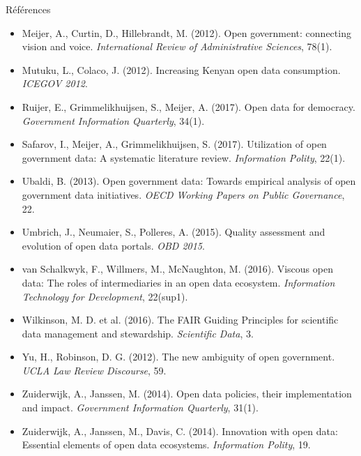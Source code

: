 \documentclass[11pt,aspectratio=169]{beamer}
\begin{document}
\begin{frame}[allowframebreaks]{Références}
\begin{itemize}
    \item Meijer, A., Curtin, D., Hillebrandt, M. (2012). Open government: connecting vision and voice. \emph{International Review of Administrative Sciences}, 78(1).
    \item Mutuku, L., Colaco, J. (2012). Increasing Kenyan open data consumption. \emph{ICEGOV 2012}.
    \item Ruijer, E., Grimmelikhuijsen, S., Meijer, A. (2017). Open data for democracy. \emph{Government Information Quarterly}, 34(1).
    \item Safarov, I., Meijer, A., Grimmelikhuijsen, S. (2017). Utilization of open government data: A systematic literature review. \emph{Information Polity}, 22(1).
    \item Ubaldi, B. (2013). Open government data: Towards empirical analysis of open government data initiatives. \emph{OECD Working Papers on Public Governance}, 22.
    \item Umbrich, J., Neumaier, S., Polleres, A. (2015). Quality assessment and evolution of open data portals. \emph{OBD 2015}.
    \item van Schalkwyk, F., Willmers, M., McNaughton, M. (2016). Viscous open data: The roles of intermediaries in an open data ecosystem. \emph{Information Technology for Development}, 22(sup1).
    \item Wilkinson, M. D. et al. (2016). The FAIR Guiding Principles for scientific data management and stewardship. \emph{Scientific Data}, 3.
    \item Yu, H., Robinson, D. G. (2012). The new ambiguity of open government. \emph{UCLA Law Review Discourse}, 59.
    \item Zuiderwijk, A., Janssen, M. (2014). Open data policies, their implementation and impact. \emph{Government Information Quarterly}, 31(1).
    \item Zuiderwijk, A., Janssen, M., Davis, C. (2014). Innovation with open data: Essential elements of open data ecosystems. \emph{Information Polity}, 19.
  \end{itemize}
\end{frame}
\end{document}
